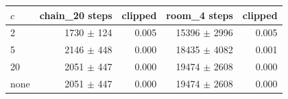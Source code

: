 \begin{tabular}{lrrrr}
\hline
$c$ & chain\_20 steps & clipped & room\_4 steps & clipped \\
\hline
2 & 1730 $\pm$ 124 & 0.005 & 15396 $\pm$ 2996 & 0.005 \\
5 & 2146 $\pm$ 448 & 0.000 & 18435 $\pm$ 4082 & 0.001 \\
20 & 2051 $\pm$ 447 & 0.000 & 19474 $\pm$ 2608 & 0.000 \\
none & 2051 $\pm$ 447 & 0.000 & 19474 $\pm$ 2608 & 0.000 \\
\hline
\end{tabular}
